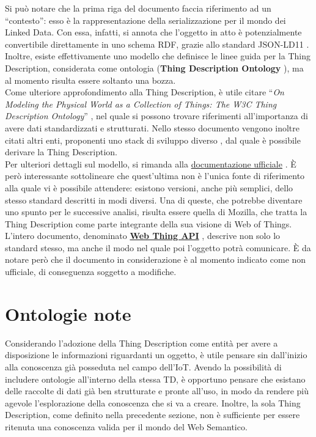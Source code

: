 \documentclass[12pt,a4paper,openright,oneside]{report}
\newcommand{\quotes}[1]{``#1''}
\begin{document}
Si può notare che la prima riga del documento faccia riferimento ad un \quotes{contesto}: esso è la rappresentazione della serializzazione per il mondo dei Linked Data. Con essa, infatti, si annota che l'oggetto in atto è potenzialmente convertibile direttamente in uno schema RDF, grazie allo standard JSON-LD11 \cite{json-ld}. Inoltre, esiste effettivamente uno modello che definisce le linee guida per la Thing Description, considerata come ontologia (\textbf{Thing Description Ontology} \cite{td-ontology}), ma al momento risulta essere soltanto una bozza.\\

Come ulteriore approfondimento alla Thing Description, è utile citare \quotes{\textit{On Modeling the Physical World as a Collection of Things: The W3C Thing Description Ontology}} \cite{td-paper}, nel quale si possono trovare riferimenti all'importanza di avere dati standardizzati e strutturati. Nello stesso documento vengono inoltre citati altri enti, proponenti uno stack di sviluppo diverso \cite{open-connectivity}, dal quale è possibile derivare la Thing Description.\\

Per ulteriori dettagli sul modello, si rimanda alla \underline{documentazione ufficiale} \cite{td}. È però interessante sottolineare che quest'ultima non è l'unica fonte di riferimento alla quale vi è possibile attendere: esistono versioni, anche più semplici, dello stesso standard descritti in modi diversi. Una di queste, che potrebbe diventare uno spunto per le successive analisi, risulta essere quella di Mozilla, che tratta la Thing Description come parte integrante della sua visione di Web of Things. L'intero documento, denominato \href{https://webthings.io/api/}{\textbf{Web Thing API}} \cite{web_thing_api}, descrive non solo lo standard stesso, ma anche il modo nel quale poi l'oggetto potrà comunicare. È da notare però che il documento in considerazione è al momento indicato come non ufficiale, di conseguenza soggetto a modifiche.\\


\section{Ontologie note}
Considerando l'adozione della Thing Description come entità per avere a disposizione le informazioni riguardanti un oggetto, è utile pensare sin dall'inizio alla conoscenza già posseduta nel campo dell'IoT. Avendo la possibilità di includere ontologie all'interno della stessa TD, è opportuno pensare che esistano delle raccolte di dati già ben strutturate e pronte all'uso, in modo da rendere più agevole l'esplorazione della conoscenza che si va a creare. Inoltre, la sola Thing Description, come definito nella precedente sezione, non è sufficiente per essere ritenuta una conoscenza valida per il mondo del Web Semantico.\\
\end{document}

